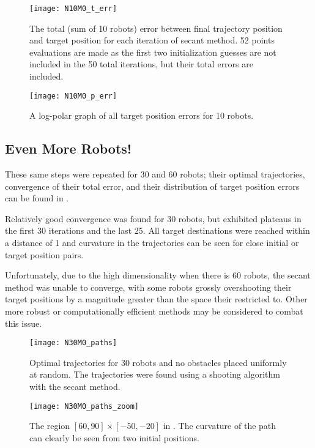 \documentclass[11pt]{article}
\begin{document}
\begin{figure}
	\centering
	\texttt{[image: N10M0\_t\_err]}
	\caption{The total (sum of 10 robots) error between final trajectory position and target position for each iteration of secant method. 52 points evaluations are made as the first two initialization guesses are not included in the 50 total iterations, but their total errors are included.}
	\label{fig:n10m0-t-err}
\end{figure}

\begin{figure}
	\centering
	\texttt{[image: N10M0\_p\_err]}
	\caption{A log-polar graph of all target position errors for 10 robots.}
	\label{fig:n10m0-p-err}
\end{figure}

\clearpage

\subsection{Even More Robots!}

These same steps were repeated for 30 and 60 robots; their optimal trajectories, convergence of their total error, and their distribution of target position errors can be found in .

Relatively good convergence was found for 30 robots, but exhibited plateaus in the first 30 iterations and the last 25. All target destinations were reached within a distance of 1 and curvature in the trajectories can be seen for close initial or target position pairs.

Unfortunately, due to the high dimensionality when there is 60 robots, the secant method was unable to converge, with some robots grossly overshooting their target positions by a magnitude greater than the space their restricted to. Other more robust or computationally efficient methods may be considered to combat this issue.

\begin{figure}
	\centering
	\texttt{[image: N30M0\_paths]}
	\caption{Optimal trajectories for 30 robots and no obstacles placed uniformly at random. The trajectories were found using a shooting algorithm with the secant method.}
	\label{fig:n30m0-paths}
\end{figure}

\begin{figure}
	\centering
	\texttt{[image: N30M0\_paths\_zoom]}
	\caption{The region \([60,90] \times [-50,-20]\) in . The curvature of the path can clearly be seen from two initial positions.}
	\label{fig:n30m0-paths-zoom}
\end{figure}
\end{document}
